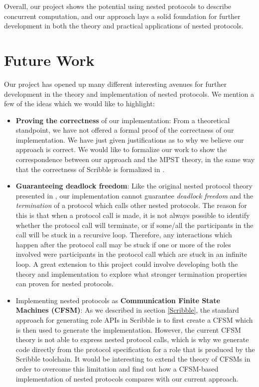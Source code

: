 \documentclass[12pt,twoside]{report}
\begin{document}
Overall, our project shows the potential using nested protocols to describe concurrent computation, and our approach lays a solid foundation for further development in both the theory and practical applications of nested protocols.

\section{Future Work}
Our project has opened up many different interesting avenues for further development in the theory and implementation of nested protocols. We mention a few of the ideas which we would like to highlight:
\begin{itemize}
    \item \textbf{Proving the correctness} of our implementation: From a theoretical standpoint, we have not offered a formal proof of the correctness of our implementation. We have just given justifications as to why we believe our approach is correct. We would like to formalize our work to show the correspondence between our approach and the MPST theory, in the same way that the correctness of Scribble is formalized in \cite{featherweight}.
    \item \textbf{Guaranteeing deadlock freedom}: Like the original nested protocol theory presented in \cite{nestedprotocols}, our implementation cannot guarantee \textit{deadlock freedom} and the \textit{termination} of a protocol which calls other nested protocols. The reason for this is that when a protocol call is made, it is not always possible to identify whether the protocol call will terminate, or if some/all the participants in the call will be stuck in a recursive loop. Therefore, any interactions which happen after the protocol call may be stuck if one or more of the roles involved were participants in the protocol call which are stuck in an infinite loop. A great extension to this project could involve developing both the theory and implementation to explore what stronger termination properties can proven for nested protocols.
    \item Implementing nested protocols as \textbf{Communication Finite State Machines (CFSM)}: As we described in section \ref{Scribble}, the standard approach for generating role APIs in Scribble is to first create a CFSM which is then used to generate the implementation. However, the current CFSM theory is not able to express nested protocol calls, which is why we generate code directly from the protocol specification for a role that is produced by the Scribble toolchain. It would be interesting to extend the theory of CFSMs in order to overcome this limitation and find out how a CFSM-based implementation of nested protocols compares with our current approach.

\end{itemize}
\end{document}
